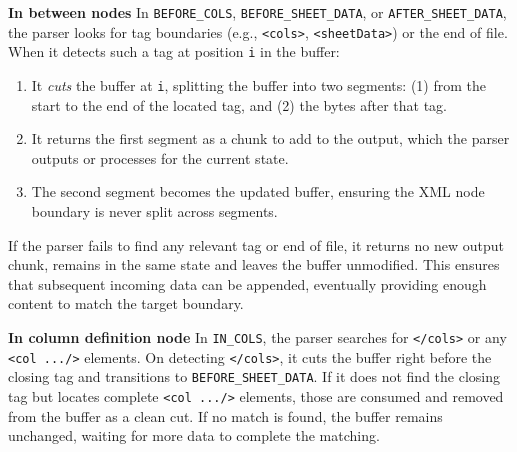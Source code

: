 \documentclass[conference]{IEEEtran}
\begin{document}
\textbf{In between nodes}
In \texttt{BEFORE\_COLS}, \texttt{BEFORE\_SHEET\_DATA}, or \texttt{AFTER\_SHEET\_DATA}, the parser looks for tag boundaries (e.g., \verb|<cols>|, \verb|<sheetData>|) or the end of file. When it detects such a tag at position \verb|i| in the buffer:
\begin{enumerate}
  \item It \emph{cuts} the buffer at \verb|i|, splitting the buffer into two segments:
   (1) from the start to the end of the located tag, and (2) the bytes after that tag.
  \item It returns the first segment as a chunk to add to the output, which the parser outputs or processes for the current state.
  \item The second segment becomes the updated buffer, ensuring the XML node boundary is never split across segments.
\end{enumerate}
If the parser fails to find any relevant tag or end of file, it returns no new output chunk, remains in the same state and leaves the buffer unmodified. This ensures that subsequent incoming data can be appended, eventually providing enough content to match the target boundary.

\textbf{In column definition node}
In \texttt{IN\_COLS}, the parser searches for \verb|</cols>| or any \verb|<col .../>| elements. On detecting \verb|</cols>|, it cuts the buffer right before the closing tag and transitions to \texttt{BEFORE\_SHEET\_DATA}. If it does not find the closing tag but locates complete \verb|<col .../>| elements, those are consumed and removed from the buffer as a clean cut. If no match is found, the buffer remains unchanged, waiting for more data to complete the matching.
\end{document}
